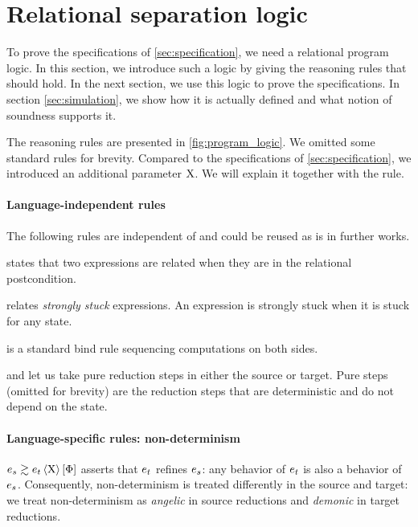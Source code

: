 \section{Relational separation logic}
\label{sec:program_logic}

To prove the specifications of \cref{sec:specification}, we need a relational program logic.
In this section, we introduce such a logic by giving the reasoning rules that should hold.
In the next section, we use this logic to prove the specifications.
In section \cref{sec:simulation}, we show how it is actually defined and what notion of soundness supports it.

The reasoning rules are presented in \cref{fig:program_logic}.
We omitted some standard rules for brevity.
Compared to the specifications of \cref{sec:specification}, we introduced an additional parameter $\mathrm{X}$.
We will explain it together with the  rule.

\paragraph{Language-independent rules}
The following rules are independent of \DataLang and could be reused as is in further works.

 states that two expressions are related when they are in the relational postcondition.

 relates \emph{strongly stuck} expressions.
An expression is strongly stuck when it is stuck for any state.

 is a standard bind rule sequencing computations on both sides.

 and  let us take pure reduction steps in either the source or target.
Pure steps (omitted for brevity) are the reduction steps that are deterministic and do not depend on the state.

\paragraph{Language-specific rules: non-determinism}
$\iSim[\iProt]{\iPred}{\datalangExpr_s}{\datalangExpr_t}$ asserts that $\datalangExpr_t$ refines $\datalangExpr_s$: any behavior of $\datalangExpr_t$ is also a behavior of $\datalangExpr_s$.
Consequently, non-determinism is treated differently in the source and target: we treat non-determinism as \emph{angelic} in source reductions and \emph{demonic} in target reductions.

